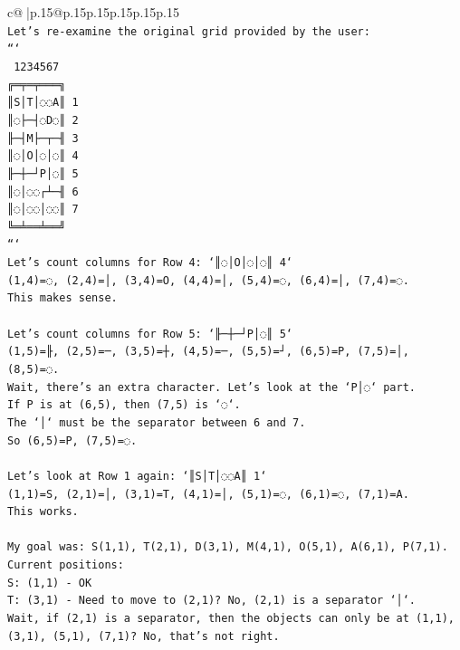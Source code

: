 \documentclass{article}
\begin{document}
{\begin{supertabular}{c@{$\;$}|p{.15\linewidth}@{}p{.15\linewidth}p{.15\linewidth}p{.15\linewidth}p{.15\linewidth}p{.15\linewidth}}
{{{\\ 
\texttt{Let's re{-}examine the original grid provided by the user:} \\
\texttt{```} \\
\texttt{ 1234567} \\
\texttt{╔═╤═╤═══╗} \\
\texttt{║S│T│◌◌A║ 1} \\
\texttt{║◌├─┤◌D◌║ 2} \\
\texttt{╟─┤M├─┬─╢ 3} \\
\texttt{║◌│O│◌│◌║ 4} \\
\texttt{╟─┼─┘P│◌║ 5} \\
\texttt{║◌│◌◌┌┴─╢ 6} \\
\texttt{║◌│◌◌│◌◌║ 7} \\
\texttt{╚═╧══╧══╝} \\
\texttt{```} \\
\texttt{Let's count columns for Row 4: `║◌│O│◌│◌║ 4`} \\
\texttt{(1,4)=◌, (2,4)=│, (3,4)=O, (4,4)=│, (5,4)=◌, (6,4)=│, (7,4)=◌.} \\
\texttt{This makes sense.} \\
\\ 
\texttt{Let's count columns for Row 5: `╟─┼─┘P│◌║ 5`} \\
\texttt{(1,5)=╟, (2,5)=─, (3,5)=┼, (4,5)=─, (5,5)=┘, (6,5)=P, (7,5)=│, (8,5)=◌.} \\
\texttt{Wait, there's an extra character. Let's look at the `P│◌` part.} \\
\texttt{If P is at (6,5), then (7,5) is `◌`.} \\
\texttt{The `│` must be the separator between 6 and 7.} \\
\texttt{So (6,5)=P, (7,5)=◌.} \\
\\ 
\texttt{Let's look at Row 1 again: `║S│T│◌◌A║ 1`} \\
\texttt{(1,1)=S, (2,1)=│, (3,1)=T, (4,1)=│, (5,1)=◌, (6,1)=◌, (7,1)=A.} \\
\texttt{This works.} \\
\\ 
\texttt{My goal was: S(1,1), T(2,1), D(3,1), M(4,1), O(5,1), A(6,1), P(7,1).} \\
\texttt{Current positions:} \\
\texttt{S: (1,1) {-} OK} \\
\texttt{T: (3,1) {-} Need to move to (2,1)? No, (2,1) is a separator `│`.} \\
\texttt{Wait, if (2,1) is a separator, then the objects can only be at (1,1), (3,1), (5,1), (7,1)? No, that's not right.} \\
}}}
\end{supertabular}}
\end{document}
